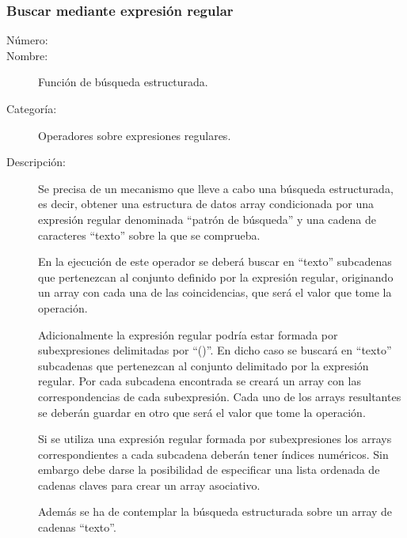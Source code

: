 \subsubsection{Buscar mediante expresión regular}
	\begin{description}
		\item [Número:] \cn
		\item [Nombre:] Función de búsqueda estructurada.
		\item [Categoría:] Operadores sobre expresiones regulares.
		\item [Descripción:] Se precisa de un mecanismo que lleve a cabo una búsqueda estructurada, es decir,
		obtener una estructura de datos array condicionada por una expresión regular denominada
		``patrón de búsqueda'' y una cadena de caracteres ``texto'' sobre la que se comprueba.

		En la ejecución de este operador se deberá
		buscar en ``texto'' subcadenas que pertenezcan al conjunto definido por la expresión regular, originando
		un array con cada una de las coincidencias, que será el valor que tome la operación.
		
		Adicionalmente la expresión regular podría estar formada por subexpresiones delimitadas
		por ``()''. En dicho caso se buscará en ``texto'' subcadenas que pertenezcan al
		conjunto delimitado por la expresión regular. Por cada subcadena encontrada se creará un array
		con las correspondencias de cada subexpresión. Cada uno de los arrays resultantes se
		deberán guardar en otro que será el valor que tome la operación.
		
		Si se utiliza una expresión regular formada por subexpresiones los arrays correspondientes
		a cada subcadena deberán tener índices numéricos. Sin embargo debe darse la posibilidad de
		especificar una lista ordenada de cadenas claves para crear un array asociativo.
 
		Además se ha de contemplar la búsqueda estructurada sobre un array de cadenas ``texto''.
	\end {description}
